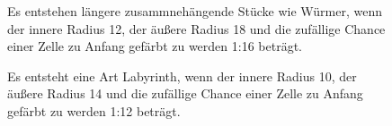 \documentclass[]{article}
\begin{document}
\newpage

\begin{figure}[h!]
	\caption{Es entstehen l\"angere zusammneh\"angende St\"ucke wie W\"urmer, wenn der innere Radius 12, der \"au\ss ere Radius 18 und die zuf\"allige Chance einer Zelle zu Anfang gef\"arbt zu werden 1:16 betr\"agt.}
\end{figure}

\begin{figure}[h!]
	\caption{Es entsteht eine Art Labyrinth, wenn der innere Radius 10, der \"au\ss ere Radius 14  und die zuf\"allige Chance einer Zelle zu Anfang gef\"arbt zu werden 1:12 betr\"agt.}
\end{figure}

\newpage
\end{document}
